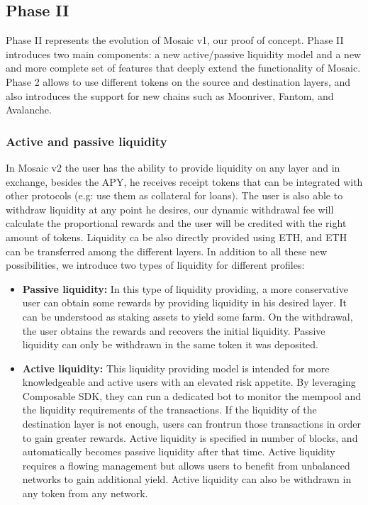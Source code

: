 \subsection{Phase II\label{sec:phaseII}}

Phase II represents the evolution of Mosaic v1, our proof of concept. Phase II introduces two main components: a new active/passive liquidity model and a new and more complete set of features that deeply extend the functionality of Mosaic. Phase 2 allows to use different tokens on the source and destination layers, and also introduces the support for new chains such as Moonriver, Fantom, and Avalanche.

\subsubsection*{Active and passive liquidity}
In Mosaic v2 the user has the ability to provide liquidity on any layer and in exchange, besides the APY, he receives receipt tokens that can be integrated with other protocols (e.g: use them as collateral for loans). The user is also able to withdraw liquidity at any point he desires, our dynamic withdrawal fee will calculate the proportional rewards and the user will be credited with the right amount of tokens. Liquidity ca be also directly provided using ETH, and ETH can be transferred among the different layers. In addition to all these new possibilities, we introduce two types of liquidity for different profiles:

    \begin{itemize}
        \item \textbf{Passive liquidity:} In this type of liquidity providing, a more conservative user can obtain some rewards by providing liquidity in his desired layer. It can be understood as staking assets to yield some farm.  On the withdrawal, the user obtains the rewards and recovers the initial liquidity. Passive liquidity can only be withdrawn in the same token it was deposited. 
        
        \item \textbf{Active liquidity:} This liquidity providing model is intended for more knowledgeable and active users with an elevated risk appetite. By leveraging Composable SDK, they can run a dedicated bot to monitor the mempool and  the liquidity requirements of the transactions. If the liquidity of the destination layer is not enough, users can frontrun those transactions in order to gain greater rewards. Active liquidity is specified in number of blocks, and automatically becomes passive liquidity after that time. Active liquidity requires a flowing management but allows users to benefit from unbalanced networks to gain additional yield. Active liquidity can also be withdrawn in any token from any network.
    \end{itemize}
    

